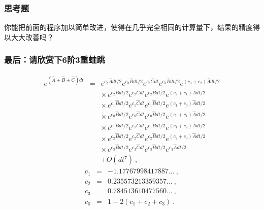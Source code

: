 \documentclass[CJK]{beamer}
\begin{document}
\begin{frame}
  \frametitle{思考题}


  你能把前面的程序加以简单改进，使得在几乎完全相同的计算量下，结果的精度得以大大改善吗？
  
\end{frame}

\begin{frame}
  \frametitle{最后：请欣赏下6阶3重蛙跳}
{\small    
\begin{eqnarray}
e^{(\hat{A}+\hat{B}+\hat{C})dt} &=& e^{c_3\hat{A}dt/2}e^{c_3\hat{B}dt/2}e^{c_3\hat{C}dt}e^{c_3\hat{B}dt/2}e^{(c_3+c_2)\hat{A}dt/2}\nonumber \\
&& \times \, e^{c_2\hat{B}dt/2}e^{c_2\hat{C}dt}e^{c_2\hat{B}dt/2}e^{(c_2+c_1)\hat{A}dt/2} \nonumber \\
&& \times \, e^{c_1\hat{B}dt/2}e^{c_1\hat{C}dt}e^{c_1\hat{B}dt/2}e^{(c_1+c_0)\hat{A}dt/2} \nonumber \\
&& \times \, e^{c_0\hat{B}dt/2}e^{c_0\hat{C}dt}e^{c_0\hat{B}dt/2}e^{(c_0+c_1)\hat{A}dt/2} \nonumber \\
&& \times \, e^{c_1\hat{B}dt/2}e^{c_1\hat{C}dt}e^{c_1\hat{B}dt/2}e^{(c_1+c_2)\hat{A}dt/2} \nonumber \\
&& \times \, e^{c_2\hat{B}dt/2}e^{c_2\hat{C}dt}e^{c_2\hat{B}dt/2}e^{(c_2+c_3)\hat{A}dt/2} \nonumber \\
&& \times \, e^{c_3\hat{B}dt/2}e^{c_3\hat{C}dt}e^{c_3\hat{B}dt/2}e^{c_3\hat{A}dt/2} \nonumber \\
&& + O(dt^7)\ , \nonumber
\end{eqnarray}
\begin{eqnarray}
c_1 &=& -1.17767998417887\ldots \ ,\nonumber \\
c_2 &=& 0.235573213359357\ldots \ ,\nonumber \\
c_3 &=& 0.784513610477560\ldots \ ,\nonumber \\
c_0 &=& 1-2(c_1+c_2+c_3) \ . \nonumber
\end{eqnarray}
}
\end{frame}


\ech
\end{document}
